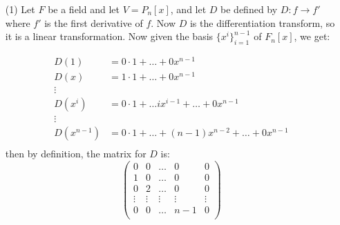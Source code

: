 \begin{example}
    \begin{enumerate}
        \item[(1)] Let $F$ be a field and let $V=P_n[x]$, and let $D$ be defined
            by  $D:f \rightarrow f'$ where $f'$ is the first derivative of  $f$.
            Now  $D$ is the differentiation transform, so it is a linear
            transformation. Now given the basis  $\{x^i\}_{i=1}^{n-1}$ of
            $F_n[x]$, we get:

                \begin{equation*}
                    \begin{align*}
                        D(1)    &=  0\cdot 1+\dots+0x^{n-1} \\
                        D(x)    &=  1 \cdot 1+\dots+0x^{n-1} \\
                                \vdots              \\
                        D(x^i)  &=  0 \cdot 1 + \dots ix^{i-1}+\dots+0x^{n-1} \\
                                \vdots                          \\
                        D(x^{{n-1}}) &=     0 \cdot
                        1+\dots+(n-1)x^{n-2}+\dots+0x^{n-1} \\
                    \end{align*}
                \end{equation*}
            then by definition, the matrix for $D$ is:
                \begin{equation*}
                    \begin{pmatrix} 
                        0   &   0   & \dots &   0   &   0   \\
                        1   &   0   & \dots &   0   &   0   \\
                        0   &   2   & \dots &   0   &   0   \\
                        \vdots & \vdots & \vdots & \vdots & \vdots \\
                        0   &   0   & \dots &   n-1   &   0   \\
                    \end{pmatrix}
                \end{equation*}


\end{enumerate}
\end{example}
